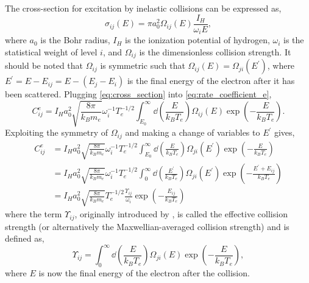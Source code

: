 The cross-section for excitation by inelastic collisions can be expressed as,
\begin{equation}\label{eq:cross_section}
    \sigma_{ij}(E) = \pi a_0^2 \Omega_{ij}(E)\frac{I_H}{\omega_iE},
\end{equation}
where $a_0$ is the Bohr radius, $I_H$ is the ionization potential of hydrogen, $\omega_i$ is the statistical weight of level $i$, and $\Omega_{ij}$ is the dimensionless collision strength. It should be noted that $\Omega_{ij}$ is symmetric such that $\Omega_{ij}(E)=\Omega_{ji}(E^{\prime})$, where $E^{\prime}=E - E_{ij} = E - (E_j - E_i)$ is the final energy of the electron after it has been scattered. Plugging \autoref{eq:cross_section} into \autoref{eq:rate_coefficient_e},
\begin{equation}
    C^e_{ij} = I_Ha_0^2\sqrt{\frac{8\pi}{k_Bm_e}}\omega_i^{-1}T_e^{-1/2}\int_{E_0}^{\infty}\dd{\left(\frac{E}{k_BT_e}\right)}\Omega_{ij}(E)\exp{\left(-\frac{E}{k_BT_e}\right)}.
\end{equation}
Exploiting the symmetry of $\Omega_{ij}$ and making a change of variables to $E^{\prime}$ gives,
\begin{align}\label{eq:rate_coefficient_final}
    C^e_{ij} &= I_Ha_0^2\sqrt{\frac{8\pi}{k_Bm_e}}\omega_i^{-1}T_e^{-1/2}\int_{E_0}^{\infty}\dd{\left(\frac{E}{k_BT_e}\right)}\Omega_{ji}(E^\prime)\exp{\left(-\frac{E}{k_BT_e}\right)} \nonumber\\
    &= I_Ha_0^2\sqrt{\frac{8\pi}{k_Bm_e}}\omega_i^{-1}T_e^{-1/2}\int_{0}^{\infty}\dd{\left(\frac{E^\prime}{k_BT_e}\right)}\Omega_{ji}(E^\prime)\exp{\left(-\frac{E^\prime + E_{ij}}{k_BT_e}\right)} \nonumber\\
    &= I_Ha_0^2\sqrt{\frac{8\pi}{k_Bm_e}}T_e^{-1/2}\frac{\Upsilon_{ij}}{\omega_i}\exp{\left(-\frac{E_{ij}}{k_BT_e}\right)}
\end{align}
where the term $\Upsilon_{ij}$, originally introduced by \citet{seaton_electron_1953}, is called the effective collision strength (or alternatively the Maxwellian-averaged collision strength) and is defined as,
\begin{equation}\label{eq:effective_collision_strength}
    \Upsilon_{ij} = \int_{0}^{\infty}\dd{\left(\frac{E}{k_BT_e}\right)}\Omega_{ji}(E)\exp{\left(-\frac{E}{k_BT_e}\right)},
\end{equation}
where $E$ is now the final energy of the electron after the collision.

